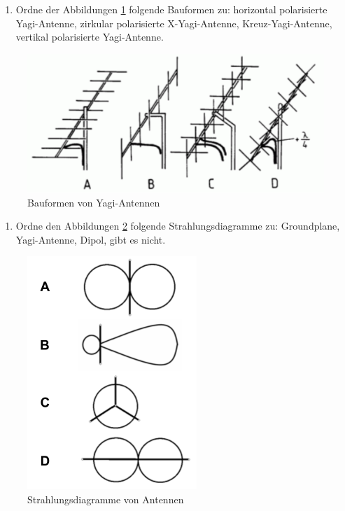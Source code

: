\begin{enumerate} 
\itemsep1pt\parskip0pt
\item[1] Ordne der Abbildungen \ref{yagi} folgende Bauformen zu: horizontal polarisierte Yagi-Antenne, zirkular polarisierte X-Yagi-Antenne, Kreuz-Yagi-Antenne, vertikal polarisierte Yagi-Antenne.
\end{enumerate}

\begin{figure}[H]
	\centering
	\includegraphics[scale=0.5]{Antennen/Bilder/TH209.pdf}
	\caption{Bauformen von Yagi-Antennen}
	\label{yagi}
\end{figure}
\begin{enumerate} 
\itemsep1pt\parskip0pt
\item[1] Ordne den Abbildungen \ref{strahlungsdiagramm} folgende Strahlungsdiagramme zu: Groundplane, Yagi-Antenne, Dipol, gibt es nicht.
\end{enumerate}

\begin{figure}[H]
	\centering
	\includegraphics[scale=0.8]{Antennen/Bilder/Strahlungsdiagramm.pdf}
	\caption{Strahlungsdiagramme von Antennen}
	\label{strahlungsdiagramm}
\end{figure}
